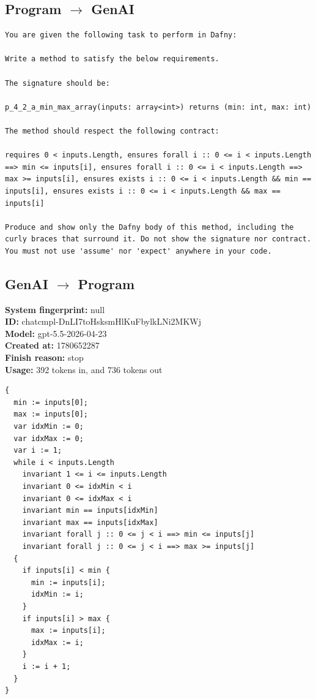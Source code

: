 \documentclass{article}
\begin{document}
\subsection*{Program $\rightarrow$ GenAI}
\begin{lstlisting}
You are given the following task to perform in Dafny:

Write a method to satisfy the below requirements.

The signature should be:

p_4_2_a_min_max_array(inputs: array<int>) returns (min: int, max: int)

The method should respect the following contract:

requires 0 < inputs.Length, ensures forall i :: 0 <= i < inputs.Length ==> min <= inputs[i], ensures forall i :: 0 <= i < inputs.Length ==> max >= inputs[i], ensures exists i :: 0 <= i < inputs.Length && min == inputs[i], ensures exists i :: 0 <= i < inputs.Length && max == inputs[i]

Produce and show only the Dafny body of this method, including the curly braces that surround it. Do not show the signature nor contract. You must not use 'assume' nor 'expect' anywhere in your code.
\end{lstlisting}
\subsection*{GenAI $\rightarrow$ Program}
\textbf{System fingerprint: }null
\\\textbf{ID: }chatcmpl-DnLI7toHsksmHlKuFbylkLNi2MKWj
\\\textbf{Model: }gpt-5.5-2026-04-23
\\\textbf{Created at: }1780652287
\\\textbf{Finish reason: }stop
\\\textbf{Usage: }392 tokens in, and 736 tokens out
\begin{lstlisting}
{
  min := inputs[0];
  max := inputs[0];
  var idxMin := 0;
  var idxMax := 0;
  var i := 1;
  while i < inputs.Length
    invariant 1 <= i <= inputs.Length
    invariant 0 <= idxMin < i
    invariant 0 <= idxMax < i
    invariant min == inputs[idxMin]
    invariant max == inputs[idxMax]
    invariant forall j :: 0 <= j < i ==> min <= inputs[j]
    invariant forall j :: 0 <= j < i ==> max >= inputs[j]
  {
    if inputs[i] < min {
      min := inputs[i];
      idxMin := i;
    }
    if inputs[i] > max {
      max := inputs[i];
      idxMax := i;
    }
    i := i + 1;
  }
}
\end{lstlisting}
\end{document}
